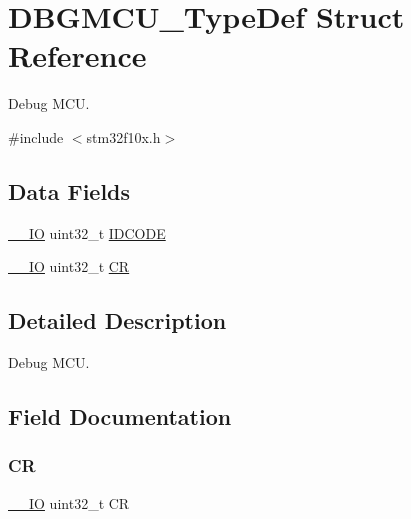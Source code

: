 \hypertarget{struct_d_b_g_m_c_u___type_def}{}\section{D\+B\+G\+M\+C\+U\+\_\+\+Type\+Def Struct Reference}
\label{struct_d_b_g_m_c_u___type_def}


Debug M\+CU.  




{\ttfamily \#include $<$stm32f10x.\+h$>$}

\subsection*{Data Fields}
\begin{DoxyCompactItemize}
\item 
\mbox{\hyperlink{core__sc300_8h_aec43007d9998a0a0e01faede4133d6be}{\+\_\+\+\_\+\+IO}} uint32\+\_\+t \mbox{\hyperlink{struct_d_b_g_m_c_u___type_def_a24df28d0e440321b21f6f07b3bb93dea}{I\+D\+C\+O\+DE}}
\item 
\mbox{\hyperlink{core__sc300_8h_aec43007d9998a0a0e01faede4133d6be}{\+\_\+\+\_\+\+IO}} uint32\+\_\+t \mbox{\hyperlink{struct_d_b_g_m_c_u___type_def_ab40c89c59391aaa9d9a8ec011dd0907a}{CR}}
\end{DoxyCompactItemize}


\subsection{Detailed Description}
Debug M\+CU. 

\subsection{Field Documentation}
\mbox{\label{struct_d_b_g_m_c_u___type_def_ab40c89c59391aaa9d9a8ec011dd0907a}} 
\subsubsection{\texorpdfstring{CR}{CR}}
{\footnotesize\ttfamily \mbox{\hyperlink{core__sc300_8h_aec43007d9998a0a0e01faede4133d6be}{\+\_\+\+\_\+\+IO}} uint32\+\_\+t CR}

\mbox{\label{struct_d_b_g_m_c_u___type_def_a24df28d0e440321b21f6f07b3bb93dea}} 
